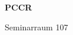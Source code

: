 \documentclass[a4paper]{article}
\begin{document}
\printGenericVSLHeader
\begin{center}
\begin{vsltext}{3cm}{4cm}

   \vspace{0.5cm} 

    \textbf{PCCR} 

    \vspace{1.5cm}

    Seminarraum 107

\end{vsltext}

\end{center}
\end{document}
